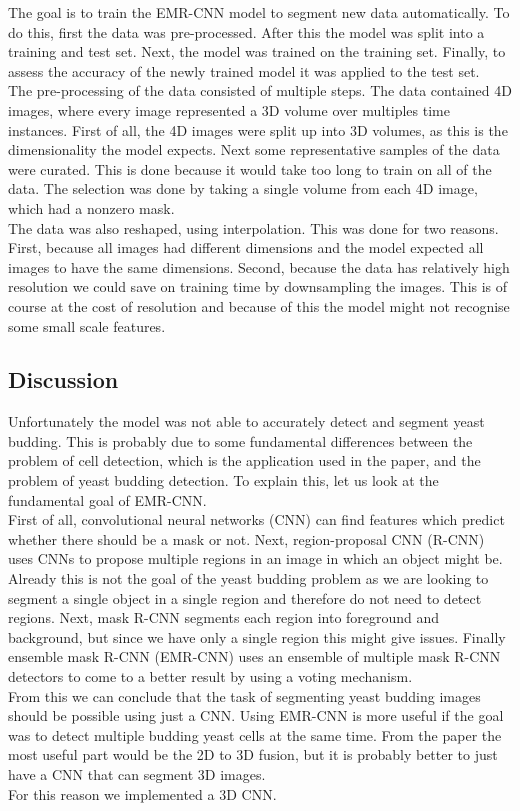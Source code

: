 \documentclass[a4]{article}
\begin{document}
The goal is to train the EMR-CNN model to segment new data automatically. To do this, first the data was pre-processed. After this the model was split into a training and test set. Next, the model was trained on the training set. Finally, to assess the accuracy of the newly trained model it was applied to the test set.\\
The pre-processing of the data consisted of multiple steps.
The data contained 4D images, where every image represented a 3D volume over multiples time instances. First of all, the 4D images were split up into 3D volumes, as this is the dimensionality the model expects. Next some representative samples of the data were curated. This is done because it would take too long to train on all of the data. The selection was done by taking a single volume from each 4D image, which had a nonzero mask.\\
The data was also reshaped, using interpolation. This was done for two reasons. First, because all images had different dimensions and the model expected all images to have the same dimensions. Second, because the data has relatively high resolution we could save on training time by downsampling the images. This is of course at the cost of resolution and because of this the model might not recognise some small scale features.


\subsection{Discussion}
Unfortunately the model was not able to accurately detect and segment yeast budding. This is probably due to some fundamental differences between the problem of cell detection, which is the application used in the paper, and the problem of yeast budding detection. To explain this, let us look at the fundamental goal of EMR-CNN.\\
First of all, convolutional neural networks (CNN) can find features which predict whether there should be a mask or not. Next, region-proposal CNN (R-CNN) uses CNNs to propose multiple regions in an image in which an object might be. Already this is not the goal of the yeast budding problem as we are looking to segment a single object in a single region and therefore do not need to detect regions. Next, mask R-CNN segments each region into foreground and background, but since we have only a single region this might give issues. Finally ensemble mask R-CNN (EMR-CNN) uses an ensemble of multiple mask R-CNN detectors to come to a better result by using a voting mechanism.\\
From this we can conclude that the task of segmenting yeast budding images should be possible using just a CNN. Using EMR-CNN is more useful if the goal was to detect multiple budding yeast cells at the same time. From the paper the most useful part would be the 2D to 3D fusion, but it is probably better to just have a CNN that can segment 3D images.\\
For this reason we implemented a 3D CNN.
\end{document}
